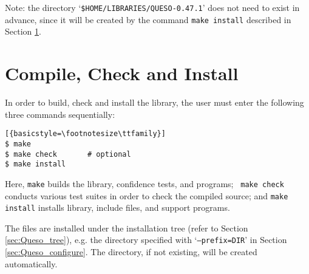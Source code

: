 Note: the directory `\verb+$HOME/LIBRARIES/QUESO-0.47.1+' does not need to exist in advance, since it will be created by the command \verb+make install+ described in Section \ref{sec:install_Queso_make}.


\section{Compile, Check and Install \Queso{}}\label{sec:install_Queso_make}
%
In order to build, check and install the library, the user must enter the following three commands sequentially:
\begin{lstlisting}[{basicstyle=\footnotesize\ttfamily}]
$ make
$ make check       # optional
$ make install 
\end{lstlisting}

Here, \verb+make+ builds the library, confidence tests, and programs;  \verb+ make check+ conducts various test suites in order to check the compiled source; and \verb+make install+ installs \Queso{} library, include files, and support programs.

The files are installed under the installation tree (refer to Section \ref{sec:Queso_tree}), e.g. the directory specified with `\texttt{--prefix=DIR}' in Section \ref{sec:Queso_configure}. The directory, if not existing, will be created automatically.%

% 
% 
% 
% 

